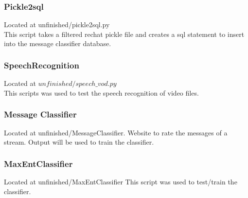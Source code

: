 \documentclass[final]{report} %
\begin{document}
\begin{appendices}
\subsubsection{Pickle2sql}
\label{script:pickle2sql}
Located at unfinished/pickle2sql.py\\
This script takes a filtered rechat pickle file and creates a sql statement to insert into the message classifier database.

\subsubsection{SpeechRecognition}
\label{script:speech_recognition}
Located at $unfinished/speech\_vod.py$\\
This scripts was used to test the speech recognition of video files. 

\subsubsection{Message Classifier}
\label{script:message_classifier}
Located at unfinished/MessageClassifier.
Website to rate the messages of a stream. Output will be used to train the classifier.

\subsubsection{MaxEntClassifier}
\label{script:max_ent_classifier}
Located at unfinished/MaxEntClassifier
This script was used to test/train the classifier.

\end{appendices}
\end{document}
